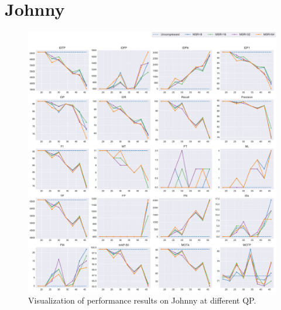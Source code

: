
\section{Johnny}
\label{sec:appendix/Johnny_all}


\begin{figure}[!htbp]
\centering
\includegraphics[width=1.0\linewidth]{img/appendix/Johnny_all_multiplots_qp.pdf}
\caption[Visualization of performance results on Johnny at different QP]
{Visualization of performance results on Johnny at different QP.}
\label{fig:Johnny_all_qp}
\end{figure}

